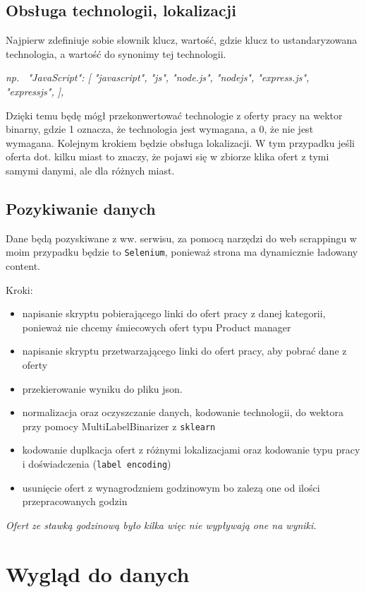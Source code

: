 \documentclass[a4paper]{article}
\begin{document}
\subsection{Obsługa technologii, lokalizacji}

\quad Najpierw zdefiniuje sobie słownik klucz, wartość, gdzie klucz to ustandaryzowana technologia, a wartość do synonimy tej technologii.

\textit{np. \ "JavaScript": [
"javascript",
"js",
"node.js",
"nodejs",
"express.js",
"expressjs",
],}

\quad Dzięki temu będę mógł przekonwertować technologie z oferty pracy na wektor binarny, gdzie 1 oznacza, że technologia jest wymagana, a 0, że nie jest wymagana. Kolejnym
krokiem będzie obsługa lokalizacji. W tym przypadku jeśli oferta dot. kilku miast to znaczy, że pojawi się w zbiorze
klika ofert z tymi samymi danymi, ale dla różnych miast.


\subsection{Pozykiwanie danych}

\quad Dane będą pozyskiwane z ww. serwisu, za pomocą narzędzi do web scrappingu w moim przypadku będzie
to \texttt{Selenium}, ponieważ strona ma dynamicznie ładowany content.


Kroki:
\begin{itemize}
    \item napisanie skryptu pobierającego linki do ofert pracy z danej kategorii, ponieważ nie chcemy śmiecowych ofert typu Product manager
    \item napisanie skryptu przetwarzającego linki do ofert pracy, aby pobrać dane z oferty
    \item przekierowanie wyniku do pliku json.
    \item normalizacja oraz oczyszczanie danych, kodowanie technologii, do wektora przy pomocy MultiLabelBinarizer z \texttt{sklearn}
    \item kodowanie duplkacja ofert z różnymi lokalizacjami oraz kodowanie typu pracy i doświadczenia (\texttt{label encoding})
    \item usunięcie ofert z wynagrodzniem godzinowym bo zalezą one od ilości przepracowanych godzin
\end{itemize}

\textit{Ofert ze stawką godzinową było kilka więc nie wypływają one na wyniki.}

\section{Wygląd do danych}
\end{document}
